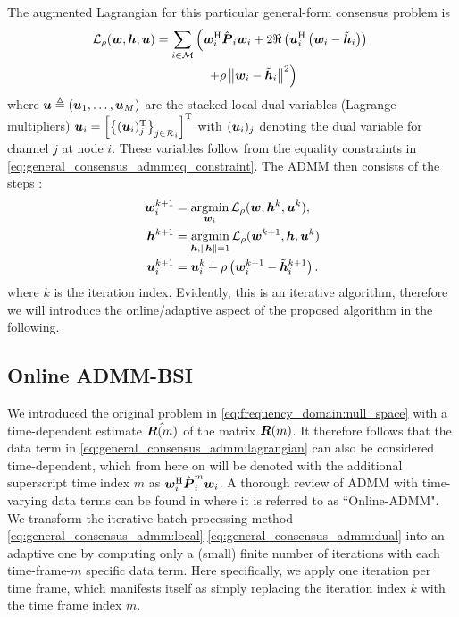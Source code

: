 \documentclass{article}
\begin{document}
The augmented Lagrangian for this particular general-form consensus problem is
\begin{align}
    \mathcal{L}_{\rho} &(\wf,\hf,\uuf) = \sum_{i \in \Mset} \left( \wf_i^\herm \hat{\aRhof}_i \wf_i + 2 \Re \left( \uuf_i^{\herm} \left(\wf_i - \tilde{\hf}_i\right) \right)\right. \vphantom{+ \rho \left\| \wf_i - \tilde{\hf}_i \right\|^2} \nonumber\\
    \vphantom{\wf_i^\herm \hat{\aRhof}_i \wf_i + 2 \Re \left( \uuf_i^{\herm} \left(\wf_i - \tilde{\hf}_i\right) \right)} & \qquad \qquad \qquad \qquad \left. + \rho \left\| \wf_i - \tilde{\hf}_i \right\|^2 \right)\label{eq:general_consensus_admm:lagrangian}
\end{align}
where \({\bm{u}} \triangleq ({\bm{u}}_1,\ldots,{\bm{u}}_M)\) are the stacked local dual variables (Lagrange multipliers) \({\bm{u}}_i = \left[ \left\{ ({\bm{u}}_i)_j^{{\mathrm{T}}} \right\}_{j \in \mathcal{R}_i} \right]^{\mathrm{T}}\) with \(({\bm{u}}_i)_j\) denoting the dual variable for channel \(j\) at node \(i\).
These variables follow from the equality constraints in \eqref{eq:general_consensus_admm:eq_constraint}.
The ADMM then consists of the steps \cite{boydDistributedOptimizationStatistical2011}:
\begin{align}
    {\bm{w}}_i^{k+1} &= \underset{{\bm{w}}_i}{\operatorname{argmin}} \, \mathcal{L}_{\rho} ({\bm{w}},{\bm{h}}^k,{\bm{u}}^k),\label{eq:general_consensus_admm:local}\\
    {\bm{h}}^{k+1} &= \underset{{\bm{h}}, \|{\bm{h}}\| = 1}{\operatorname{argmin}}\, \mathcal{L}_{\rho} ({\bm{w}}^{k+1},{\bm{h}},{\bm{u}}^k)\label{eq:general_consensus_admm:global}\\
    {\bm{u}}_i^{k+1} &= {\bm{u}}_i^{k} + \rho \left( {\bm{w}}_i^{k+1} - \tilde{{\bm{h}}}_i^{k+1} \right).\label{eq:general_consensus_admm:dual}
\end{align}
where \(k\) is the iteration index. Evidently, this is an iterative algorithm, therefore we will introduce the online/adaptive aspect of the proposed algorithm in the following.

\subsection{Online ADMM-BSI}
\label{ssec:online_admm}
We introduced the original problem in \eqref{eq:frequency_domain:null_space} with a time-dependent estimate \(\hat{{\bm{{R}}}(m)}\) of the matrix \({\bm{{R}}}(m)\). It therefore follows that the data term in \eqref{eq:general_consensus_admm:lagrangian} can also be considered time-dependent, which from here on will be denoted with the additional superscript time index \(m\) as \({\bm{w}}_i^{\mathrm{H}} \hat{{\bm{{P}}}}_i^{m} {\bm{w}}_i\).
A thorough review of ADMM with time-varying data terms can be found in \cite{wangOnlineAlternatingDirection2013,hosseiniOnlineDistributedADMM2014} where it is referred to as ``Online-ADMM".
We transform the iterative batch processing method \eqref{eq:general_consensus_admm:local}-\eqref{eq:general_consensus_admm:dual} into an adaptive one by computing only a (small) finite number of iterations with each time-frame-\(m\) specific data term.
Here specifically, we apply one iteration per time frame, which manifests itself as simply replacing the iteration index \(k\) with the time frame index \(m\).
\end{document}
